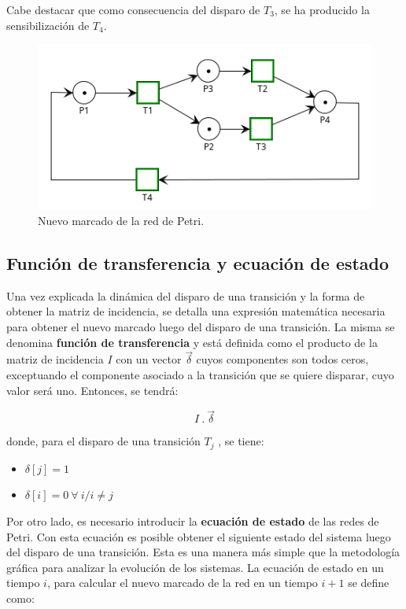 Cabe destacar que como consecuencia del disparo de $T_3$, se ha producido la sensibilización de $T_4$.

\begin{figure}[H]
	\centering
	\includegraphics[scale=1.00]{Figures/marco teorico/imag3.png}
	\caption{Nuevo marcado de la red de Petri.}
	\label{fig:rdp2.3_disparada}
  \end{figure}


\subsection{Función de transferencia y ecuación de estado}
Una vez explicada la dinámica del disparo de una transición y la forma de obtener la matriz de incidencia, se detalla una expresión matemática necesaria para obtener el nuevo marcado luego del disparo de una transición. 
La misma se denomina \textbf{función de transferencia} y está definida como el producto de la matriz de incidencia $I$ con un vector $\vec{\delta}$ cuyos componentes son todos ceros, exceptuando el componente asociado a la transición que se quiere disparar, cuyo valor será uno. Entonces, se tendrá:

\begin{equation}
    I \ . \ \vec{\delta }    
\end{equation}

\noindent donde, para el disparo de una transición $T_j$ , se tiene:
\begin{itemize}
    \item $\delta[j] = 1$
    \item $\delta[i] = 0 \ \forall \ i/i \neq j$
\end{itemize}

Por otro lado, es necesario introducir la \textbf{ecuación de estado} de las redes de Petri. Con esta ecuación es posible obtener el siguiente estado del sistema luego del disparo de una transición. Esta es una manera más simple que la metodología gráfica para analizar la evolución de los sistemas. La ecuación de estado en un tiempo $i$, para calcular el nuevo marcado de la red en un tiempo $i+1$ se define como:

